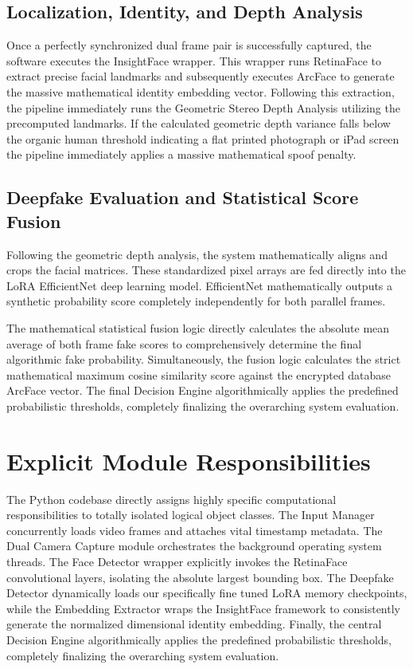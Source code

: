 \documentclass[12pt,a4paper]{report}
\begin{document}
\subsection{Localization, Identity, and Depth Analysis}
Once a perfectly synchronized dual frame pair is successfully captured, the software executes the InsightFace wrapper. This wrapper runs RetinaFace to extract precise facial landmarks and subsequently executes ArcFace to generate the massive mathematical identity embedding vector. Following this extraction, the pipeline immediately runs the Geometric Stereo Depth Analysis utilizing the precomputed landmarks. If the calculated geometric depth variance falls below the organic human threshold indicating a flat printed photograph or iPad screen the pipeline immediately applies a massive mathematical spoof penalty.

\subsection{Deepfake Evaluation and Statistical Score Fusion}
Following the geometric depth analysis, the system mathematically aligns and crops the facial matrices. These standardized pixel arrays are fed directly into the LoRA EfficientNet deep learning model. EfficientNet mathematically outputs a synthetic probability score completely independently for both parallel frames. 

The mathematical statistical fusion logic directly calculates the absolute mean average of both frame fake scores to comprehensively determine the final algorithmic fake probability. Simultaneously, the fusion logic calculates the strict mathematical maximum cosine similarity score against the encrypted database ArcFace vector. The final Decision Engine algorithmically applies the predefined probabilistic thresholds, completely finalizing the overarching system evaluation.

\section{Explicit Module Responsibilities}
The Python codebase directly assigns highly specific computational responsibilities to totally isolated logical object classes. The Input Manager concurrently loads video frames and attaches vital timestamp metadata. The Dual Camera Capture module orchestrates the background operating system threads. The Face Detector wrapper explicitly invokes the RetinaFace convolutional layers, isolating the absolute largest bounding box. The Deepfake Detector dynamically loads our specifically fine tuned LoRA memory checkpoints, while the Embedding Extractor wraps the InsightFace framework to consistently generate the normalized dimensional identity embedding. Finally, the central Decision Engine algorithmically applies the predefined probabilistic thresholds, completely finalizing the overarching system evaluation.
\end{document}
